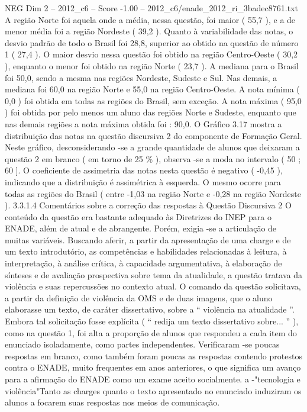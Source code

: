 \begin{textsample}{NEG Dim 2 – 2012\_c6 – Score -1.00 – 2012\_c6/enade\_2012\_ri\_3badec8761.txt}
A região Norte foi aquela onde a média, nessa questão, foi maior ( 55,7 ), e a de menor média foi a região Nordeste ( 39,2 ).
Quanto à variabilidade das notas, o desvio padrão de todo o Brasil foi 28,8, superior ao obtido na questão de número 1 ( 27,4 ).
O maior desvio nessa questão foi obtido na região Centro-Oeste ( 30,2 ), enquanto o menor foi obtido na região Norte ( 23,7 ).
A mediana para o Brasil foi 50,0, sendo a mesma nas regiões Nordeste, Sudeste e Sul.
Nas demais, a mediana foi 60,0 na região Norte e 55,0 na região Centro-Oeste.
A nota mínima ( 0,0 ) foi obtida em todas as regiões do Brasil, sem exceção.
A nota máxima ( 95,0 ) foi obtida por pelo menos um aluno das regiões Norte e Sudeste, enquanto que nas demais regiões a nota máxima obtida foi : 90,0.
O Gráfico 3.17 mostra a distribuição das notas na questão discursiva 2 do componente de Formação Geral.
Neste gráfico, desconsiderando -se a grande quantidade de alunos que deixaram a questão 2 em branco ( em torno de 25 \% ), observa -se a moda no intervalo ( 50 ; 60 ].
O coeficiente de assimetria das notas nesta questão é negativo ( -0,45 ), indicando que a distribuição é assimétrica à esquerda.
O mesmo ocorre para todas as regiões do Brasil ( entre -1,03 na região Norte e -0,28 na região Nordeste ). 3.3.1.4 Comentários sobre a correção das respostas à Questão Discursiva 2 O conteúdo da questão era bastante adequado às Diretrizes do INEP para o ENADE, além de atual e de abrangente.
Porém, exigia -se a articulação de muitas variáveis.
Buscando aferir, a partir da apresentação de uma charge e de um texto introdutório, as competências e habilidades relacionadas à leitura, à interpretação, à análise crítica, à capacidade argumentativa, à elaboração de sínteses e de avaliação prospectiva sobre tema da atualidade, a questão tratava da violência e suas repercussões no contexto atual.
O comando da questão solicitava, a partir da definição de violência da OMS e de duas imagens, que o aluno elaborasse um texto, de caráter dissertativo, sobre a “ violência na atualidade ”.
Embora tal solicitação fosse explícita ( “ redija um texto dissertativo sobre... ” ), como na questão 1, foi alta a proporção de alunos que respondeu a cada item do enunciado isoladamente, como partes independentes.
Verificaram -se poucas respostas em branco, como também foram poucas as respostas contendo protestos contra o ENADE, muito frequentes em anos anteriores, o que significa um avanço para a afirmação do ENADE como um exame aceito socialmente. a -"tecnologia e violência"Tanto as charges quanto o texto apresentado no enunciado induziram os alunos a focarem suas respostas nos meios de comunicação.

\end{textsample}
